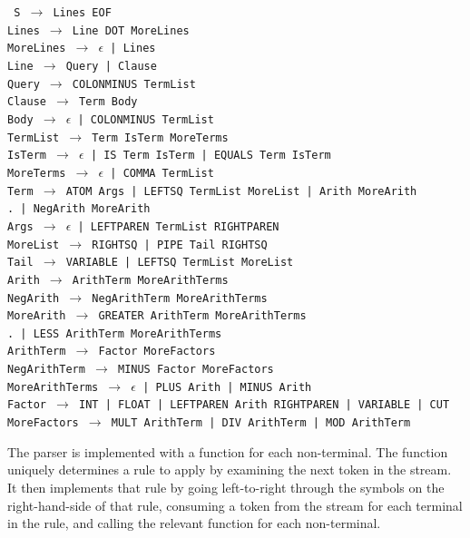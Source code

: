 \documentclass[12pt]{article}
\begin{document}
\newpage

\texttt{
S $\rightarrow$ Lines EOF\\
Lines $\rightarrow$ Line DOT MoreLines\\
MoreLines $\rightarrow$ $\epsilon$ | Lines\\
Line $\rightarrow$ Query | Clause\\
Query $\rightarrow$ COLONMINUS TermList\\
Clause $\rightarrow$ Term Body\\
Body $\rightarrow$ $\epsilon$ | COLONMINUS TermList\\
TermList $\rightarrow$ Term IsTerm MoreTerms\\
IsTerm $\rightarrow$ $\epsilon$ | IS Term IsTerm | EQUALS Term IsTerm\\
MoreTerms $\rightarrow$ $\epsilon$ | COMMA TermList\\
Term $\rightarrow$ ATOM Args | LEFTSQ TermList MoreList | Arith MoreArith\\
.\hspace{20px} | NegArith MoreArith \\
Args $\rightarrow$ $\epsilon$ | LEFTPAREN TermList RIGHTPAREN\\
MoreList $\rightarrow$ RIGHTSQ | PIPE Tail RIGHTSQ\\
Tail $\rightarrow$ VARIABLE | LEFTSQ TermList MoreList\\
Arith $\rightarrow$ ArithTerm MoreArithTerms\\
NegArith $\rightarrow$ NegArithTerm MoreArithTerms\\
MoreArith $\rightarrow$ GREATER ArithTerm MoreArithTerms\\
.\hspace{50px} | LESS ArithTerm MoreArithTerms \\
ArithTerm $\rightarrow$ Factor MoreFactors\\
NegArithTerm $\rightarrow$ MINUS Factor MoreFactors\\
MoreArithTerms $\rightarrow$ $\epsilon$ | PLUS Arith | MINUS Arith\\
Factor $\rightarrow$ INT | FLOAT | LEFTPAREN Arith RIGHTPAREN | VARIABLE | CUT\\
MoreFactors $\rightarrow$ MULT ArithTerm | DIV ArithTerm | MOD ArithTerm
}

The parser is implemented with a function for each non-terminal. 
The function uniquely determines a rule to apply by examining the next token in the stream. 
It then implements that rule by going left-to-right through the symbols on the right-hand-side of that rule, consuming a token from the stream for each terminal in the rule, and calling the relevant function for each non-terminal.
\end{document}
